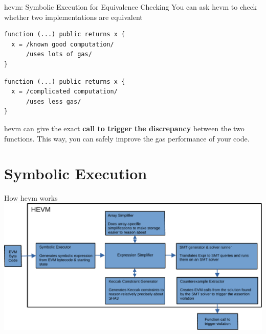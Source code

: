 \documentclass[aspectratio=169]{beamer}
\begin{document}
\begin{frame}[fragile=singleslide]{hevm: Symbolic Execution for Equivalence Checking}
You can ask hevm to check whether two implementations are equivalent
\bigskip
\\

\begin{minipage}[b]{0.45\textwidth}
\begin{Verbatim}[frame=single, framerule=0.2mm, framesep=2mm,fontsize=\small]
function (...) public returns x {
  x = /known good computation/
      /uses lots of gas/
}
    \end{Verbatim}
  \end{minipage}
  \begin{minipage}[b]{0.45\textwidth}
  \begin{Verbatim}[frame=single, framerule=0.2mm, framesep=2mm,fontsize=\small]
function (...) public returns x {
  x = /complicated computation/
      /uses less gas/
}
\end{Verbatim}
\end{minipage}

hevm can give the exact \textbf{call to trigger the discrepancy} between the two functions. This way, you can safely improve the gas performance of your code.
\end{frame}

\section{Symbolic Execution}
\begin{frame}{How hevm works}
\centering
\includegraphics[scale=0.6]{hevm-overview}

\end{frame}
\end{document}
